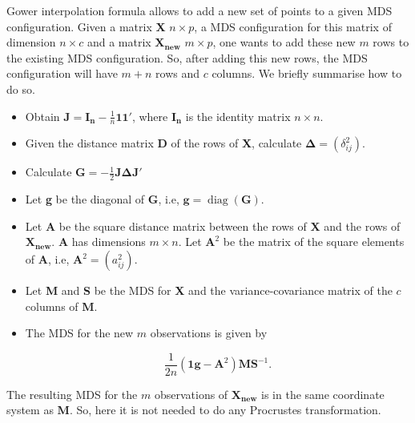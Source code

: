 \documentclass[11pt]{report}
\DeclareMathOperator{\diag}{diag}
\begin{document}
Gower interpolation formula \cite{gowerformula} allows to add a new set of 
points to a given MDS configuration. Given a matrix \textbf{X} $n \times p$, 
a MDS configuration for this matrix of dimension $n \times c$ and a matrix 
$\mathbf{X_{new}}$ $m \times p$, one wants to add these new $m$ 
rows to the existing MDS configuration. So, after adding this new rows, 
the MDS configuration will have $m+n$ rows and $c$ columns. 
We briefly summarise how to do so.

\begin{itemize}

\item Obtain $\mathbf{J} = \mathbf{I_n} - \frac{1}{n}\mathbf{1}\mathbf{1}'$,
where $\mathbf{I_n}$ is the identity matrix $n \times n$.

\item Given the distance matrix \textbf{D} of the rows of \textbf{X},
calculate $\mathbf{\Delta} = (\delta_{ij}^2)$.

\item Calculate $\mathbf{G} = - \frac{1}{2} \mathbf{J} \mathbf{\Delta} \mathbf{J}'$

\item Let \textbf{g} be the diagonal of \textbf{G}, i.e, 
$\mathbf{g} = \diag({\mathbf{G}})$.

\item Let \textbf{A} be the square distance matrix between the rows of 
\textbf{X} and the rows of $\mathbf{X_{new}}$. \textbf{A} has dimensions 
$m \times n$. Let $\mathbf{A}^2$ be the matrix of the square elements 
of \textbf{A}, i.e, $\mathbf{A}^2 = (a_{ij}^2)$.

\item Let \textbf{M} and \textbf{S} be the MDS for \textbf{X} and the 
variance-covariance matrix of the $c$ columns of \textbf{M}.

\item The MDS for the new $m$ observations is given by

\begin{equation} \label{gower_f}
\frac{1}{2n} (\mathbf{1}\mathbf{g} - \mathbf{A}^2) \mathbf{M}\mathbf{S}^{-1}.
\end{equation}

\end{itemize}

The resulting MDS for the $m$ observations of $\mathbf{X_{new}}$ is in the same
coordinate system as \textbf{M}. So, here it is not needed to do any 
Procrustes transformation.
\end{document}
